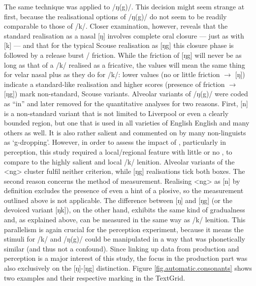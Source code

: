 The same technique was applied to /ŋ(g)/.
This decision might seem strange at first, because the realisational options of /ŋ(g)/ do not seem to be readily comparable to those of /k/.
Closer examination, however, reveals that the standard realisation as a nasal [ŋ] involves complete oral closure --- just as with [k] --- and that for the typical Scouse realisation as [ŋg] this closure phase is followed by a release burst / friction.
While the friction of [ŋg] will never be as long as that of a /k/ realised as a fricative, the  values will mean the same thing for velar nasal plus as they do for /k/: lower values (no or little friction \(\rightarrow\) [ŋ]) indicate a standard-like realisation and higher scores (presence of friction \(\rightarrow\) [ŋg]) mark non-standard, Scouse variants.
Alveolar variants of /ŋ(g)/ were coded as ``in'' and later removed for the quantitative analyses for two reasons.
First, [n] is a non-standard variant that is not limited to Liverpool or even a clearly bounded region, but one that is used in all varieties of English English and many others as well.
It is also rather salient and commented on by many non-linguists as \enquote*{g-dropping}.
However, in order to assess the impact of , particularly in perception, this study required a local/regional feature with little or no , to compare to the highly salient and local /k/ lenition.
Alveolar variants of the <ng> cluster fulfil neither criterion, while [ŋg] realisations tick both boxes.
The second reason concerns the method of measurement.
Realising <ng> as [n] by definition excludes the presence of even a hint of a plosive, so the  measurement outlined above is not applicable.
The difference between [ŋ] and [ŋg] (or the devoiced variant [ŋk]), on the other hand, exhibits the same kind of gradualness and, as explained above, can be measured in the same way as /k/ lenition.
This parallelism is again crucial for the perception experiment, because it means the stimuli for /k/ and /ŋ(g)/ could be manipulated in a way that was phonetically similar (and thus not a confound).
Since linking up data from production and perception is a major interest of this study, the focus in the production part was also exclusively on the [ŋ]-[ŋg] distinction.
Figure \ref{fig.automatic.consonants} shows two examples and their respective marking in the TextGrid.


